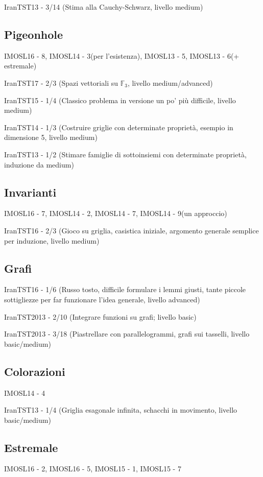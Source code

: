 \documentclass[a4paper,10pt]{article}
\newcommand{\Pro}[3]{#1#2 - #3}
\begin{document}
\Pro{IranTST}{13}{3/14} (Stima alla Cauchy-Schwarz, livello medium)

\subsection{Pigeonhole}
\Pro{IMOSL}{16}{8}, \Pro{IMOSL}{14}{3}(per l'esistenza), \Pro{IMOSL}{13}{5}, \Pro{IMOSL}{13}{6}(+ estremale)

\Pro{IranTST}{17}{2/3} (Spazi vettoriali su $\mathbb{F}_3$, livello medium/advanced)

\Pro{IranTST}{15}{1/4} (Classico problema in versione un po' più difficile, livello medium)

\Pro{IranTST}{14}{1/3} (Costruire griglie con determinate proprietà, esempio in dimensione 5, livello medium)

\Pro{IranTST}{13}{1/2} (Stimare famiglie di sottoinsiemi con determinate proprietà, induzione da medium)

\subsection{Invarianti}
\Pro{IMOSL}{16}{7}, \Pro{IMOSL}{14}{2}, \Pro{IMOSL}{14}{7}, \Pro{IMOSL}{14}{9}(un approccio)

\Pro{IranTST}{16}{2/3} (Gioco su griglia, casistica iniziale, argomento generale semplice per induzione, livello medium)

\subsection{Grafi}
\Pro{IranTST}{16}{1/6} (Russo tosto, difficile formulare i lemmi giusti, tante piccole sottigliezze per far funzionare
l'idea generale, livello advanced)

\Pro{IranTST}{2013}{2/10} (Integrare funzioni su grafi; livello basic)

\Pro{IranTST}{2013}{3/18} (Piastrellare con parallelogrammi, grafi sui tasselli, livello basic/medium)

\subsection{Colorazioni}
\Pro{IMOSL}{14}{4}

\Pro{IranTST}{13}{1/4} (Griglia esagonale infinita, schacchi in movimento, livello basic/medium)

\subsection{Estremale}
\Pro{IMOSL}{16}{2}, \Pro{IMOSL}{16}{5}, \Pro{IMOSL}{15}{1}, \Pro{IMOSL}{15}{7}
\end{document}
